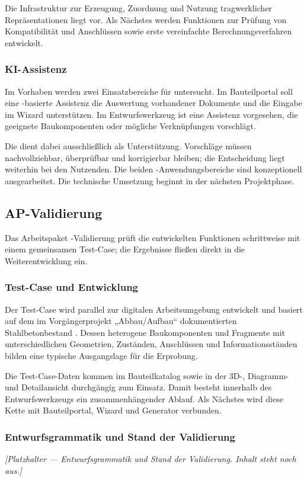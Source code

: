 \documentclass[type=zwischenbericht]{zukunftbau}
\begin{document}
Die Infrastruktur zur Erzeugung, Zuordnung und Nutzung tragwerklicher Repräsentationen liegt vor. Als Nächstes werden Funktionen zur Prüfung von Kompatibilität und Anschlüssen sowie erste vereinfachte Berechnungsverfahren entwickelt.

\subsubsection{KI-Assistenz}
Im Vorhaben werden zwei Einsatzbereiche für  untersucht. Im Bauteilportal soll eine -basierte Assistenz die Auswertung vorhandener Dokumente und die Eingabe im Wizard unterstützen. Im Entwurfswerkzeug ist eine Assistenz vorgesehen, die geeignete Baukomponenten oder mögliche Verknüpfungen vorschlägt.

Die  dient dabei ausschließlich als Unterstützung. Vorschläge müssen nachvollziehbar, überprüfbar und korrigierbar bleiben; die Entscheidung liegt weiterhin bei den Nutzenden. Die beiden -Anwendungsbereiche sind konzeptionell ausgearbeitet. Die technische Umsetzung beginnt in der nächsten Projektphase.

\subsection{AP-Validierung}

Das Arbeitspaket -Validierung prüft die entwickelten Funktionen schrittweise mit einem gemeinsamen Test-Case; die Ergebnisse fließen direkt in die Weiterentwicklung ein.

\subsubsection{Test-Case und Entwicklung}
Der Test-Case wird parallel zur digitalen Arbeitsumgebung entwickelt und basiert auf dem im Vorgängerprojekt „Abbau/Aufbau“ dokumentierten Stahlbetonbestand \cite{henschel-abbau-aufbau-2020}. Dessen heterogene Baukomponenten und Fragmente mit unterschiedlichen Geometrien, Zuständen, Anschlüssen und Informationsständen bilden eine typische Ausgangslage für die Erprobung.

Die Test-Case-Daten kommen im Bauteilkatalog sowie in der 3D-, Diagramm- und Detailansicht durchgängig zum Einsatz. Damit besteht innerhalb des Entwurfswerkzeugs ein zusammenhängender Ablauf. Als Nächstes wird diese Kette mit Bauteilportal, Wizard und Generator verbunden.

\subsubsection{Entwurfsgrammatik und Stand der Validierung}
\begin{Blockquote}
\textit{[Platzhalter --- \Gls{Entwurfsgrammatik} und Stand der Validierung. Inhalt steht noch aus.]}
\end{Blockquote}
\end{document}
